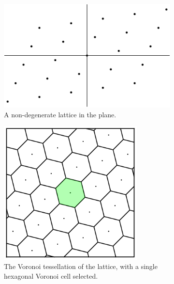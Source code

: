 \documentclass[12pt,twoside]{reedthesis}
\theoremstyle{definition}
\begin{document}
\begin{figure}[t!]
  \centering
  \begin{subfigure}[t]{0.45\textwidth}
    \centering
    \includegraphics[width=\textwidth]{figures/subset_homeomorphism_step_1.pdf}
    \caption{A non-degenerate lattice in the plane.}
  \end{subfigure}
  \hfill
  \begin{subfigure}[t]{0.45\textwidth}
    \centering
    \includegraphics[width=0.8\textwidth]{figures/subset_homeomorphism_step_2.pdf}
    \caption{The Voronoi tessellation of the lattice, with a single hexagonal Voronoi cell selected.}
  \end{subfigure}
  \hfill
  \begin{subfigure}[t]{0.45\textwidth}
    \centering

\end{subfigure}
\end{figure}
\end{document}
